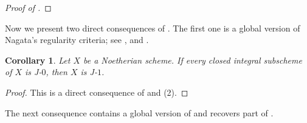 \documentclass[11pt]{amsart}
\theoremstyle{plain}
\newtheorem{corollary}[theorem]{Corollary}
\theoremstyle{definition}
\numberwithin{equation}{section}
\numberwithin{theorem}{section}
\begin{document}
\begin{proof}[Proof of ]

\end{proof}


Now we present two direct consequences of . The first one is a global version  of Nagata's regularity criteria; see \cite[Corollary 2.7]{Iyengar/Takahashi:2019}, \cite[32.A]{Matsumura} and \cite[Tag 07P9]{StacksProject}. 

\begin{corollary}\label{NagC}  Let $X$ be a Noetherian scheme. If every closed integral subscheme of $X$ is J-$0$, then $X$ is J-$1$.
\end{corollary}

\begin{proof} This is a direct consequence of  and (2).
\end{proof} 

The next consequence contains a global version of \cite[Proposition 2.8]{Iyengar/Takahashi:2019} and recovers part of \cite[Theorem 1, Proposition 1]{Nagata:1959}. 
\end{document}
